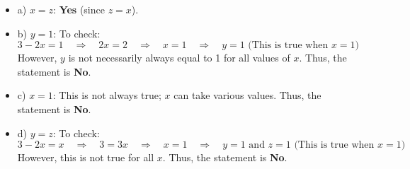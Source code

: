 \documentclass{article}
\begin{document}
\begin{itemize}
    \item a) \( x = z \): \textbf{Yes} (since \( z = x \)).
    
    \item b) \( y = 1 \): To check:
    \[
    3 - 2x = 1 \quad \Rightarrow \quad 2x = 2 \quad \Rightarrow \quad x = 1 \quad \Rightarrow \quad y = 1 \text{ (This is true when } x = 1\text{)}
    \]
    However, \( y \) is not necessarily always equal to 1 for all values of \( x \). Thus, the statement is \textbf{No}.
    
    \item c) \( x = 1 \): This is not always true; \( x \) can take various values. Thus, the statement is \textbf{No}.
    
    \item d) \( y = z \): To check:
    \[
    3 - 2x = x \quad \Rightarrow \quad 3 = 3x \quad \Rightarrow \quad x = 1 \quad \Rightarrow \quad y = 1 \text{ and } z = 1 \text{ (This is true when } x = 1\text{)}
    \]
    However, this is not true for all \( x \). Thus, the statement is \textbf{No}.
\end{itemize}
\end{document}
